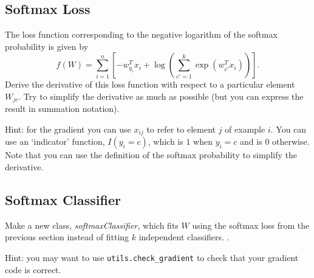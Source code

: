 \documentclass{article}
\begin{document}
\subsection{Softmax Loss}

The loss function corresponding to the negative logarithm of the softmax probability is given by
\[
f(W) = \sum_{i=1}^n \left[-w_{y_i}^Tx_i + \log\left(\sum_{c' = 1}^k \exp(w_{c'}^Tx_i)\right)\right].
\]
Derive the derivative of this loss function with respect to a particular element $W_{jc}$. Try to simplify the derivative as much as possible (but you can express the result in summation notation).

Hint: for the gradient you can use $x_{ij}$ to refer to element $j$ of example $i$. You can use an `indicator' function, $I(y_i = c)$, which is $1$ when $y_i = c$ and is $0$ otherwise. Note that you can use the definition of the softmax probability to simplify the derivative.

\subsection{Softmax Classifier}

Make a new class, \emph{softmaxClassifier}, which fits $W$ using the softmax loss from the previous section  instead of fitting $k$ independent classifiers. .

Hint: you may want to use \verb|utils.check_gradient| to check that your gradient code is correct.
\end{document}
